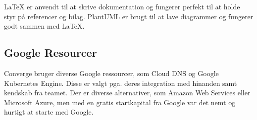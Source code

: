 LaTeX \cite[LaTex]{converge-terms} er anvendt til at skrive dokumentation og fungerer perfekt til at holde styr på referencer og bilag. PlantUML \cite[PlantUML]{converge-terms} er brugt til at lave diagrammer og fungerer godt sammen med LaTeX.

\subsection{Google Resourcer}

Converge bruger diverse Google ressourcer, som Cloud DNS \cite{application-development-dokumentation} og Google Kubernetes Engine. Disse er valgt pga. deres integration med hinanden samt kendskab fra teamet. Der er diverse alternativer, som Amazon Web Services eller Microsoft Azure, men med en gratis startkapital fra Google var det nemt og hurtigt at starte med Google.